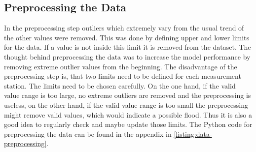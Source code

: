\subsection{Preprocessing the Data}\label{subsection:data-preprocessing}
In the preprocessing step outliers which extremely vary from the usual trend of the other values were removed. This was done by defining upper and lower limits for the data. If a value is not inside this limit it is removed from the dataset. The thought behind preprocessing the data was to increase the model performance by removing extreme outlier values from the beginning. The disadvantage of the preprocessing step is, that two limits need to be defined for each measurement station. The limits need to be chosen carefully. On the one hand, if the valid value range is too large, no extreme outliers are removed and the preprocessing is useless, on the other hand, if the valid value range is too small the preprocessing might remove valid values, which would indicate a possible flood. Thus it is also a good idea to regularly check and maybe update those limits.
\newline
The Python code for preprocessing the data can be found in the appendix in \autoref{listing:data-preprocessing}.

